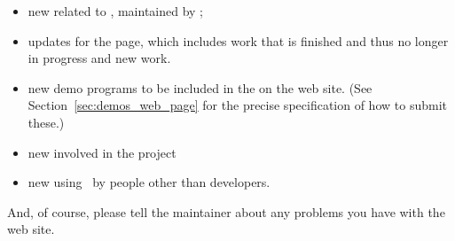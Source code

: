 \begin{itemize}
   \item new
         related to \cgal, maintained by
         ;
   \item updates for the
         page, which includes work that is finished and thus no longer in
         progress and new work.
   \item new demo programs to be included in the
         on the web site. (See Section~\ref{sec:demos_web_page}
         for the precise specification of how to submit these.)
   \item new
         involved in the project
   \item new
         using \cgal\ by people other than developers.
\end{itemize}

And, of course, please tell the maintainer about any problems you have
with the web site.

